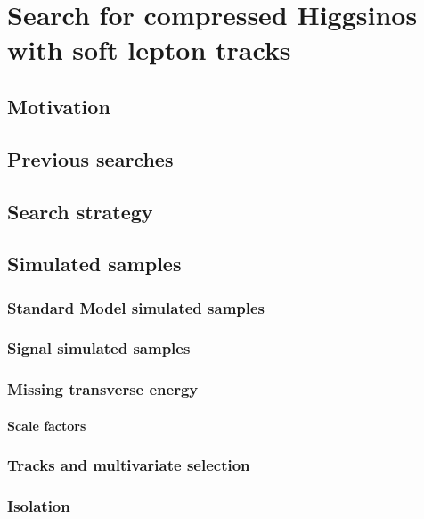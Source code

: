 \chapter{Search for compressed Higgsinos  with soft
lepton tracks}

\section{Motivation}

\section{Previous searches}




\section{Search strategy}

\section{Simulated samples}
\subsection{Standard Model simulated samples}
\subsection{Signal simulated samples}



\subsection{Missing transverse energy}
\label{subsec:met}

\clearpage
\subsubsection{Scale factors}


\subsection{Tracks and multivariate selection }
\subsection{Isolation}


